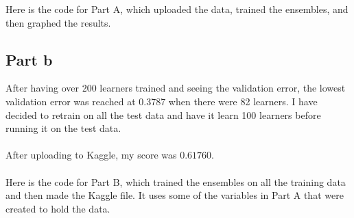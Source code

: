 \documentclass[twoside,11pt]{article}
\theoremstyle{definition}
\begin{document}
\newpage

Here is the code for Part A, which uploaded the data, trained the ensembles, and then graphed the results.


\newpage

\subsection*{Part b}

After having over 200 learners trained and seeing the validation error, the lowest validation error was reached at 0.3787 when there were 82 learners. I have decided to retrain on all the test data and have it learn 100 learners before running it on the test data. \\
\\
After uploading to Kaggle, my score was $0.61760$.\\
\\
Here is the code for Part B, which trained the ensembles on all the training data and then made the Kaggle file. It uses some of the variables in Part A that were created to hold the data. \\

\end{document}
